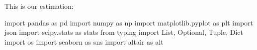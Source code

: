 \documentclass[
  letterpaper,
  DIV=11,
  numbers=noendperiod]{scrreprt}
\newenvironment{Shaded}{\begin{snugshade}}{\end{snugshade}}
\newcommand{\ImportTok}[1]{\textcolor[rgb]{0.00,0.46,0.62}{#1}}
\newcommand{\NormalTok}[1]{\textcolor[rgb]{0.00,0.23,0.31}{#1}}
\begin{document}
This is our estimation:

\begin{Shaded}
\begin{Highlighting}[]
\ImportTok{import}\NormalTok{ pandas }\ImportTok{as}\NormalTok{ pd }
\ImportTok{import}\NormalTok{ numpy }\ImportTok{as}\NormalTok{ np }
\ImportTok{import}\NormalTok{ matplotlib.pyplot }\ImportTok{as}\NormalTok{ plt }
\ImportTok{import}\NormalTok{ json }
\ImportTok{import}\NormalTok{ scipy.stats }\ImportTok{as}\NormalTok{ stats}
\ImportTok{from}\NormalTok{ typing }\ImportTok{import}\NormalTok{ List, Optional, Tuple, Dict}
\ImportTok{import}\NormalTok{ os }
\ImportTok{import}\NormalTok{ seaborn }\ImportTok{as}\NormalTok{ sns}
\ImportTok{import}\NormalTok{ altair }\ImportTok{as}\NormalTok{ alt }
\end{Highlighting}
\end{Shaded}
\end{document}

